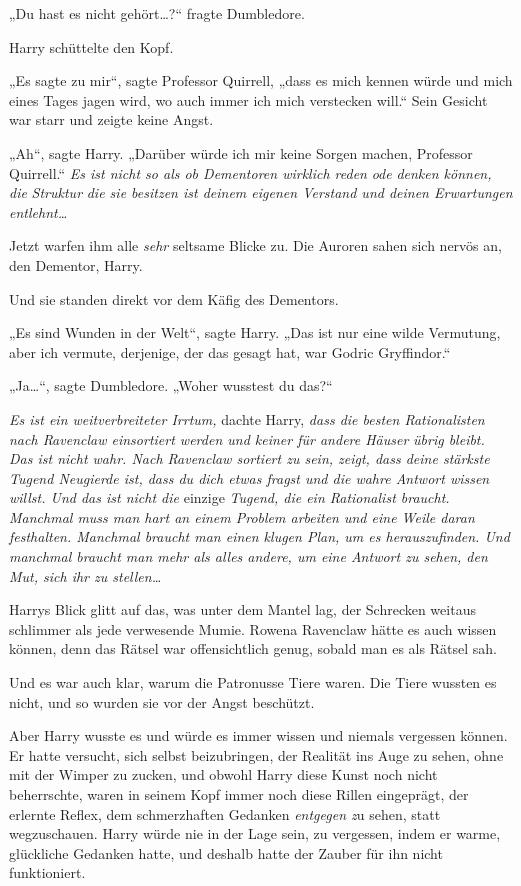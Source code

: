 {„Du hast es nicht gehört…?“ fragte Dumbledore.

Harry schüttelte den Kopf.

„Es sagte zu mir“, sagte Professor Quirrell, „dass es mich kennen würde und mich eines Tages jagen wird, wo auch immer ich mich verstecken will.“ Sein Gesicht war starr und zeigte keine Angst.

„Ah“, sagte Harry. „Darüber würde ich mir keine Sorgen machen, Professor Quirrell.“ \emph{Es ist nicht so als ob Dementoren wirklich reden} \emph{ode} \emph{denken können, die} \emph{Struktur} \emph{die sie besitzen ist deinem eigenen Verstand und deinen Erwartungen entlehnt…}

Jetzt warfen ihm alle \emph{sehr} seltsame Blicke zu. Die Auroren sahen sich nervös an, den Dementor, Harry.

Und sie standen direkt vor dem Käfig des Dementors.

„Es sind Wunden in der Welt“, sagte Harry. „Das ist nur eine wilde Vermutung, aber ich vermute, derjenige, der das gesagt hat, war Godric Gryffindor.“

„Ja…“, sagte Dumbledore. „Woher wusstest du das?“

\emph{Es ist ein weitverbreiteter Irrtum,} dachte Harry, \emph{dass die besten Rationalisten nach Ravenclaw einsortiert werden und keiner für andere Häuser} \emph{übrig bleibt. Das ist nicht wahr. Nach Ravenclaw sortiert zu sein, zeigt, dass deine stärkste Tugend Neugierde ist, dass du dich etwas fragst und die wahre Antwort wissen willst. Und das ist nicht die} einzige \emph{Tugend, die ein Rationalist braucht. Manchmal muss man hart an einem Problem arbeiten und eine Weile daran festhalten. Manchmal braucht man einen klugen Plan, um es herauszufinden. Und manchmal braucht man mehr als alles andere, um eine Antwort zu sehen, den Mut, sich ihr zu stellen…}

Harrys Blick glitt auf das, was unter dem Mantel lag, der Schrecken weitaus schlimmer als jede verwesende Mumie. Rowena Ravenclaw hätte es auch wissen können, denn das Rätsel war offensichtlich genug, sobald man es als Rätsel sah.

Und es war auch klar, warum die Patronusse Tiere waren. Die Tiere wussten es nicht, und so wurden sie vor der Angst beschützt.

Aber Harry wusste es und würde es immer wissen und niemals vergessen können. Er hatte versucht, sich selbst beizubringen, der Realität ins Auge zu sehen, ohne mit der Wimper zu zucken, und obwohl Harry diese Kunst noch nicht beherrschte, waren in seinem Kopf immer noch diese Rillen eingeprägt, der erlernte Reflex, dem schmerzhaften Gedanken \emph{entgegen z}u sehen, statt wegzuschauen. Harry würde nie in der Lage sein, zu vergessen, indem er warme, glückliche Gedanken hatte, und deshalb hatte der Zauber für ihn nicht funktioniert.

}
